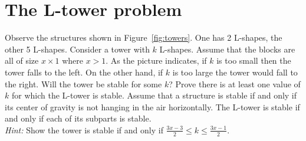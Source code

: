 \documentclass[12pt]{article}
\begin{document}


\newcommand{\bigbox}{\fbox{\vspace{0.5in} \hspace{0.75in}}}

\section{The L-tower problem}


Observe the structures shown in Figure~\ref{fig:towers}.  One has 2 L-shapes, the other 5 L-shapes. Consider a tower with $k$ L-shapes.  Assume that the blocks are all of size $x\times 1$ where $x > 1$. As the picture indicates,  if $k$ is too small then the tower falls to the left. On the other hand, if $k$ is too large the tower would fall to the right. Will the tower be stable for some $k$?  Prove there is at least one value of $k$ for which the L-tower is stable.  Assume that a structure is stable if and only if its center of gravity is not hanging in the air horizontally. The L-tower is stable if and only if each of its subparts is stable.   \\

\emph{Hint:}  Show the tower is stable if and only if $\frac{3x - 3}{2} \leq  k \leq \frac{3x - 1}{2} $.
\end{document}
